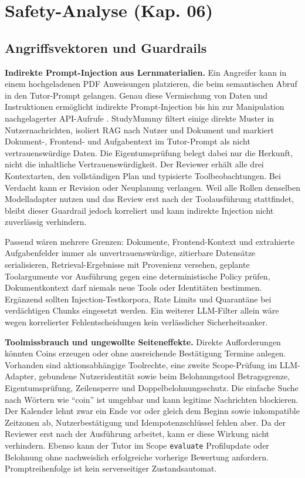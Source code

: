 \section{Safety-Analyse (Kap. 06)}
\label{sec:safety}

\subsection{Angriffsvektoren und Guardrails}

\textbf{Indirekte Prompt-Injection aus Lernmaterialien.} Ein Angreifer kann in
einem hochgeladenen PDF Anweisungen platzieren, die beim semantischen Abruf in
den Tutor-Prompt gelangen. Genau diese Vermischung von Daten und Instruktionen
ermöglicht indirekte Prompt-Injection bis hin zur Manipulation nachgelagerter
API-Aufrufe \parencite{greshakeEtAl2023}. StudyMummy filtert einige direkte
Muster in Nutzernachrichten, isoliert RAG nach Nutzer und Dokument und markiert
Dokument-, Frontend- und Aufgabentext im Tutor-Prompt als
nicht vertrauenswürdige Daten. Die Eigentumsprüfung belegt dabei nur die
Herkunft, nicht die inhaltliche Vertrauenswürdigkeit. Der Reviewer erhält
alle drei Kontextarten, den vollständigen Plan und typisierte
Toolbeobachtungen. Bei Verdacht kann er Revision oder Neuplanung verlangen.
Weil alle Rollen denselben Modelladapter nutzen und das Review erst nach der
Toolausführung stattfindet, bleibt dieser Guardrail jedoch korreliert und kann
indirekte Injection nicht zuverlässig verhindern.

Passend wären mehrere Grenzen: Dokumente, Frontend-Kontext und extrahierte
Aufgabenfelder immer als
unvertrauenswürdige, zitierbare Datensätze serialisieren, Retrieval-Ergebnisse
mit Provenienz versehen, geplante Toolargumente vor Ausführung gegen eine
deterministische Policy prüfen, Dokumentkontext darf niemals neue Tools oder
Identitäten bestimmen. Ergänzend sollten Injection-Testkorpora, Rate Limits
und Quarantäne bei verdächtigen Chunks eingesetzt werden. Ein weiterer
LLM-Filter allein wäre wegen korrelierter Fehlentscheidungen kein verlässlicher
Sicherheitsanker.

\textbf{Toolmissbrauch und ungewollte Seiteneffekte.} Direkte Aufforderungen
könnten Coins erzeugen oder ohne ausreichende Bestätigung Termine anlegen.
Vorhanden sind aktionsabhängige Toolrechte, eine zweite Scope-Prüfung im
LLM-Adapter, gebundene Nutzeridentität sowie beim Belohnungstool Betragsgrenze,
Eigentumsprüfung, Zeilensperre und Doppelbelohnungsschutz. Die einfache Suche
nach Wörtern wie \enquote{coin} ist umgehbar und kann legitime Nachrichten
blockieren. Der Kalender lehnt zwar ein Ende vor oder gleich dem
Beginn sowie inkompatible Zeitzonen ab, Nutzerbestätigung und
Idempotenzschlüssel fehlen aber. Da der Reviewer erst nach der Ausführung
arbeitet, kann er diese Wirkung nicht verhindern. Ebenso kann der Tutor im
Scope \texttt{evaluate} Profilupdate oder Belohnung ohne nachweislich
erfolgreiche vorherige Bewertung anfordern. Promptreihenfolge ist kein
serverseitiger Zustandsautomat.

